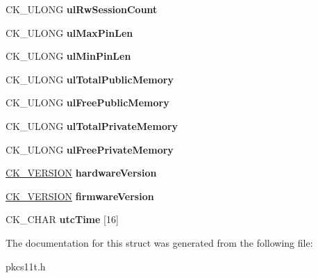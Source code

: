 \begin{DoxyCompactItemize}
C\+K\+\_\+\+U\+L\+O\+NG {\bfseries ul\+Rw\+Session\+Count}
\item 
\mbox{\label{struct_c_k___t_o_k_e_n___i_n_f_o_a1f29203a601da021aec840cf41f6e88f}} 
C\+K\+\_\+\+U\+L\+O\+NG {\bfseries ul\+Max\+Pin\+Len}
\item 
\mbox{\label{struct_c_k___t_o_k_e_n___i_n_f_o_a257a8ad60444cccd096244845bf5cd5c}} 
C\+K\+\_\+\+U\+L\+O\+NG {\bfseries ul\+Min\+Pin\+Len}
\item 
\mbox{\label{struct_c_k___t_o_k_e_n___i_n_f_o_a0aa3a573f644deb017cf90248815d9a1}} 
C\+K\+\_\+\+U\+L\+O\+NG {\bfseries ul\+Total\+Public\+Memory}
\item 
\mbox{\label{struct_c_k___t_o_k_e_n___i_n_f_o_afa0e875af02a7e9402ac3d78d517a7f5}} 
C\+K\+\_\+\+U\+L\+O\+NG {\bfseries ul\+Free\+Public\+Memory}
\item 
\mbox{\label{struct_c_k___t_o_k_e_n___i_n_f_o_a042bdb8180b0229b4b93a0198c96da6e}} 
C\+K\+\_\+\+U\+L\+O\+NG {\bfseries ul\+Total\+Private\+Memory}
\item 
\mbox{\label{struct_c_k___t_o_k_e_n___i_n_f_o_adad9cc7cf84f4499afbf4c9ca2782753}} 
C\+K\+\_\+\+U\+L\+O\+NG {\bfseries ul\+Free\+Private\+Memory}
\item 
\mbox{\label{struct_c_k___t_o_k_e_n___i_n_f_o_ac392afd0c02f4d48bd163abe68618f12}} 
\hyperlink{struct_c_k___v_e_r_s_i_o_n}{C\+K\+\_\+\+V\+E\+R\+S\+I\+ON} {\bfseries hardware\+Version}
\item 
\mbox{\label{struct_c_k___t_o_k_e_n___i_n_f_o_a2851fdb1978d35536ef5b4992a93e3e1}} 
\hyperlink{struct_c_k___v_e_r_s_i_o_n}{C\+K\+\_\+\+V\+E\+R\+S\+I\+ON} {\bfseries firmware\+Version}
\item 
\mbox{\label{struct_c_k___t_o_k_e_n___i_n_f_o_a381d3a6da89db61815436a01596cf618}} 
C\+K\+\_\+\+C\+H\+AR {\bfseries utc\+Time} \mbox{[}16\mbox{]}
\end{DoxyCompactItemize}


The documentation for this struct was generated from the following file\+:\begin{DoxyCompactItemize}
\item 
pkcs11t.\+h\end{DoxyCompactItemize}

